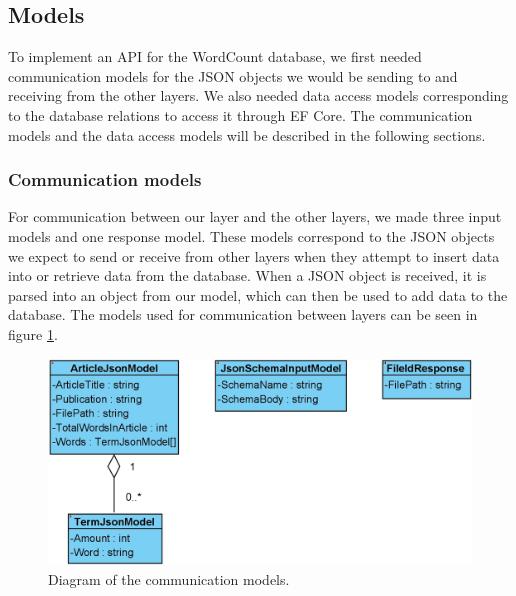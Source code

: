 \subsection{Models}\label{models}
To implement an API for the WordCount database, we first needed communication models for the JSON objects we would be sending to and receiving from the other layers. 
We also needed data access models corresponding to the database relations to access it through EF Core. 
The communication models and the data access models will be described in the following sections.

\subsubsection*{Communication models}
For communication between our layer and the other layers, we made three input models and one response model. 
These models correspond to the JSON objects we expect to send or receive from other layers when they attempt to insert data into or retrieve data from the database. 
When a JSON object is received, it is parsed into an object from our model, which can then be used to add data to the database. The models used for communication between layers can be seen in figure \ref*{fig:CommunicationModels}.
\\
\begin{figure}[H]
    \centering
    \includegraphics[scale=0.4]{Images/CommunicationModels.jpg}
    \caption{Diagram of the communication models.}
    \label{fig:CommunicationModels}
\end{figure}

